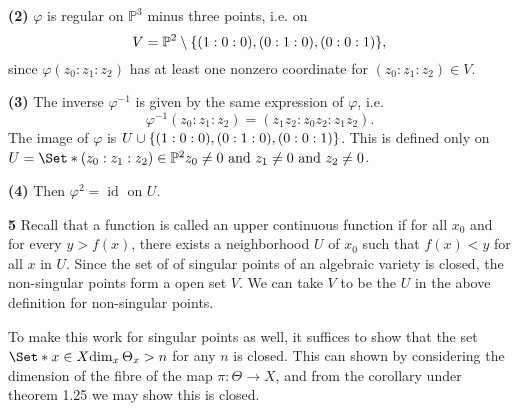 \documentclass{article}
\makeatletter
\newcommand*{\shifttext}[1]{%
  \settowidth{\@tempdima}{#1}%
  \hspace{-\@tempdima}#1%
}
\newcommand{\plabel}[1]{%
\shifttext{\textbf{#1}\quad}%
}
\newcommand{\prule}{%
\begin{center}%
\hdashrule[0.5ex]{.99\linewidth}{1pt}{1pt 2.5pt}%
\end{center}%
}
\makeatother
\begin{document}
\plabel{(2)}%
$\varphi$ is regular on $\mathbb{P}^3$ minus three points, i.e. on
\[ V = \mathbb{P}^2 \setminus \qty{(1:0:0), (0:1:0), (0:0:1)}, \]
since $\varphi(z_0:z_1:z_2)$ has at least one nonzero coordinate for $(z_0:z_1:z_2)\in V$.

\plabel{(3)}%
The inverse $\varphi^{-1}$ is given by the same expression of $\varphi$, i.e.
\[ \varphi^{-1}(z_0:z_1:z_2) = (z_1z_2:z_0z_2:z_1z_2). \]
The image of $\varphi$ is $U \cup \qty{(1:0:0),(0:1:0),(0:0:1)}$.
This is defined only on $U = \Set*{(z_0:z_1:z_2) \in \mathbb{P}^2}{z_0 \neq 0 \text{ and } z_1 \neq 0 \text{ and } z_2 \neq 0}$.

\plabel{(4)}%
Then $\varphi^2 = \operatorname{id}$ on $U$.

\prule

\plabel{5}%
Recall that a function is called an upper continuous function if for all $x_0$ and for every $y>f(x)$, there exists a neighborhood $U$ of $x_0$ such that $f(x) < y$ for all $x$ in $U$.
Since the set of of singular points of an algebraic variety is closed, the non-singular points form a open set $V$.
We can take $V$ to be the $U$ in the above definition for non-singular points.
\par
To make this work for singular points as well, it suffices to show that the set $\Set*{x\in X}{\dim_x \Theta_x > n}$ for any $n$ is closed.
This can shown by considering the dimension of the fibre of the map $\pi\colon \Theta \to X$, and from the corollary under theorem 1.25 we may show this is closed.
\end{document}
